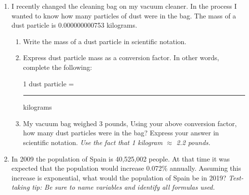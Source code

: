 \documentclass[12pt]{article}
\begin{document}
\begin{enumerate}
\newpage
\item I recently changed the cleaning bag on my vacuum cleaner.  In the process I wanted to know how many particles of dust were in the bag.  The mass of a dust particle is 0.000000000753 kilograms.

\begin{enumerate}
\item Write the mass of a dust particle in scientific notation.
\vfill
\item Express dust particle mass as a conversion factor.  In other words, complete the following:
\vspace{0.2in}
\begin{center} 1 dust particle = \rule{1.5in}{.01in} kilograms \end{center}
\vspace{0.2in}

\item My vacuum bag weighed 3 pounds, Using your above conversion factor, how many dust particles were in the bag? Express your answer in scientific notation.  \emph{Use the fact that 1 kilogram $\approx$ 2.2 pounds.}
\vfill
\end{enumerate}

\item In 2009 the population of Spain is 40,525,002 people.  At that time it was expected that the population would increase 0.072\% annually.  Assuming this increase is exponential, what would the population of Spain be in 2019?  \emph{Test-taking tip: Be sure to name variables and identify all formulas used.}
\vfill
\end{enumerate}
\end{document}
